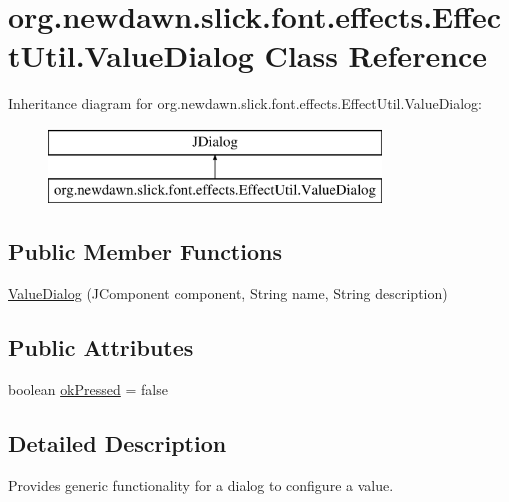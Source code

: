 \hypertarget{classorg_1_1newdawn_1_1slick_1_1font_1_1effects_1_1_effect_util_1_1_value_dialog}{}\section{org.\+newdawn.\+slick.\+font.\+effects.\+Effect\+Util.\+Value\+Dialog Class Reference}
\label{classorg_1_1newdawn_1_1slick_1_1font_1_1effects_1_1_effect_util_1_1_value_dialog}
Inheritance diagram for org.\+newdawn.\+slick.\+font.\+effects.\+Effect\+Util.\+Value\+Dialog\+:\begin{figure}[H]
\begin{center}
\leavevmode
\includegraphics[height=2.000000cm]{classorg_1_1newdawn_1_1slick_1_1font_1_1effects_1_1_effect_util_1_1_value_dialog}
\end{center}
\end{figure}
\subsection*{Public Member Functions}
\begin{DoxyCompactItemize}
\item 
\mbox{\hyperlink{classorg_1_1newdawn_1_1slick_1_1font_1_1effects_1_1_effect_util_1_1_value_dialog_aa84e1b302b409d56d3d46e4e14acc58f}{Value\+Dialog}} (J\+Component component, String name, String description)
\end{DoxyCompactItemize}
\subsection*{Public Attributes}
\begin{DoxyCompactItemize}
\item 
boolean \mbox{\hyperlink{classorg_1_1newdawn_1_1slick_1_1font_1_1effects_1_1_effect_util_1_1_value_dialog_ad9cf435423031592402344dec1314245}{ok\+Pressed}} = false
\end{DoxyCompactItemize}


\subsection{Detailed Description}
Provides generic functionality for a dialog to configure a value. 

